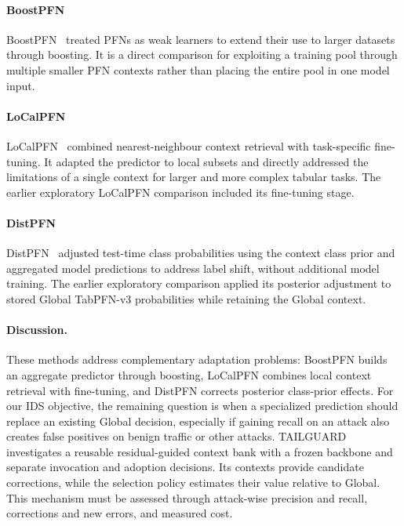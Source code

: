 \documentclass[sigconf,anonymous,pbalance]{acmart}
\begin{document}
\paragraph{BoostPFN}
BoostPFN~\cite{wang2025boostpfn} treated PFNs as weak learners to extend their use to larger datasets through boosting. It is a direct comparison for exploiting a training pool through multiple smaller PFN contexts rather than placing the entire pool in one model input.

\paragraph{LoCalPFN}
LoCalPFN~\cite{thomas2024retrieval} combined nearest-neighbour context retrieval with task-specific fine-tuning. It adapted the predictor to local subsets and directly addressed the limitations of a single context for larger and more complex tabular tasks. The earlier exploratory LoCalPFN comparison included its fine-tuning stage.

\paragraph{DistPFN}
DistPFN~\cite{lee2026distpfn} adjusted test-time class probabilities using the context class prior and aggregated model predictions to address label shift, without additional model training. The earlier exploratory comparison applied its posterior adjustment to stored Global TabPFN-v3 probabilities while retaining the Global context.

\paragraph{Discussion.}
These methods address complementary adaptation problems: BoostPFN builds an aggregate predictor through boosting, LoCalPFN combines local context retrieval with fine-tuning, and DistPFN corrects posterior class-prior effects. For our IDS objective, the remaining question is when a specialized prediction should replace an existing Global decision, especially if gaining recall on an attack also creates false positives on benign traffic or other attacks. TAILGUARD investigates a reusable residual-guided context bank with a frozen backbone and separate invocation and adoption decisions. Its contexts provide candidate corrections, while the selection policy estimates their value relative to Global. This mechanism must be assessed through attack-wise precision and recall, corrections and new errors, and measured cost. 
\end{document}
